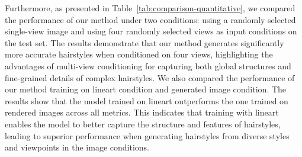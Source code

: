 Furthermore, as presented in Table~\ref{tab:comparison-quantitative}, we compared the performance of our method under two conditions: using a randomly selected single-view image and using four randomly selected views as input conditions on the test set. The results demonstrate that our method generates significantly more accurate hairstyles when conditioned on four views, highlighting the advantages of multi-view conditioning for capturing both global structures and fine-grained details of complex hairstyles. We also compared the performance of our method training on lineart condition and generated image condition. The results show that the model trained on lineart outperforms the one trained on rendered images across all metrics. This indicates that training with lineart enables the model to better capture the structure and features of hairstyles, leading to superior performance when generating hairstyles from diverse styles and viewpoints in the image conditions.



